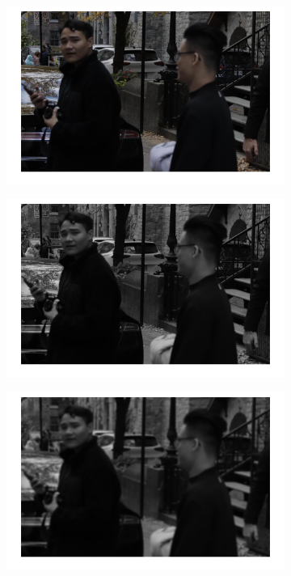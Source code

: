 \documentclass[conference]{IEEEtran}
\begin{document}
\begin{figure}[h!]
\centering
\begin{subfigure}[b]{0.3\linewidth}
\includegraphics[width=\linewidth]{images/img7.jpg}
\caption{}
\end{subfigure}
\begin{subfigure}[b]{0.3\linewidth}
\includegraphics[width=\linewidth]{images/img8.jpg}
\caption{}
\end{subfigure}
\begin{subfigure}[b]{0.3\linewidth}
\includegraphics[width=\linewidth]{images/img9.jpg}

\end{subfigure}
\end{figure}
\end{document}
